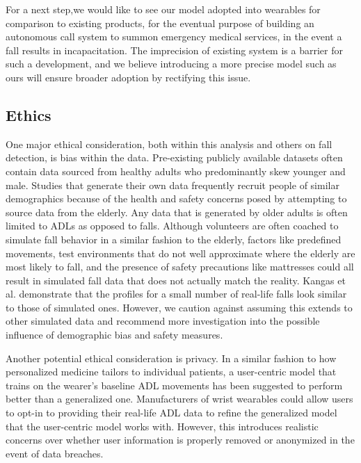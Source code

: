 \documentclass{llncs}
\begin{document}
For a next step,we would like to see our model adopted into wearables for comparison to existing products, for the eventual purpose of building an autonomous call system to summon emergency medical services, in the event a fall results in incapacitation. The imprecision of existing system is a barrier for such a development, and we believe introducing a more precise model such as ours will ensure broader adoption by rectifying this issue.




\subsection{Ethics}

    One major ethical consideration, both within this analysis and others on fall detection, is bias within the data. Pre-existing publicly available datasets often contain data sourced from healthy adults who predominantly skew younger and male.\cite{casilari2017analysis} Studies that generate their own data frequently recruit people of similar demographics because of the health and safety concerns posed by attempting to source data from the elderly.\cite{gjoreski2016accurately} Any data that is generated by older adults is often limited to ADLs as opposed to falls. Although volunteers are often coached to simulate fall behavior in a similar fashion to the elderly, factors like predefined movements, test environments that do not well approximate where the elderly are most likely to fall, and the presence of safety precautions like mattresses could all result in simulated fall data that does not actually match the reality.\cite{casilari2017analysis} Kangas et al. demonstrate that the profiles for a small number of real-life falls look similar to those of simulated ones.\cite{kangas2008comparison} However, we caution against assuming this extends to other simulated data and recommend more investigation into the possible influence of demographic bias and safety measures.
	
	Another potential ethical consideration is privacy. In a similar fashion to how personalized medicine tailors to individual patients, a user-centric model that trains on the wearer's baseline ADL movements has been suggested to perform better than a generalized one.\cite{villar2019online} Manufacturers of wrist wearables could allow users to opt-in to providing their real-life ADL data to refine the generalized model that the user-centric model works with. However, this introduces realistic concerns over whether user information is properly removed or anonymized in the event of data breaches.
\end{document}
